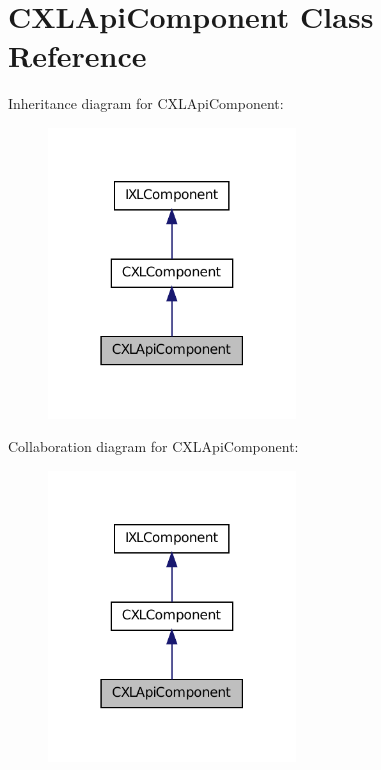 \hypertarget{classCXLApiComponent}{
\section{CXLApiComponent Class Reference}
\label{classCXLApiComponent}
}


Inheritance diagram for CXLApiComponent:\nopagebreak
\begin{figure}[H]
\begin{center}
\leavevmode
\includegraphics[width=186pt]{classCXLApiComponent__inherit__graph}
\end{center}
\end{figure}


Collaboration diagram for CXLApiComponent:\nopagebreak
\begin{figure}[H]
\begin{center}
\leavevmode
\includegraphics[width=186pt]{classCXLApiComponent__coll__graph}
\end{center}
\end{figure}
